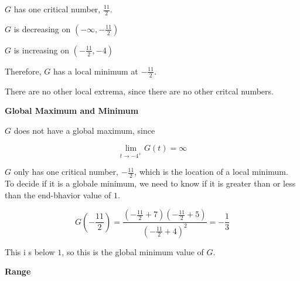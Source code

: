 \documentclass{ximera}
\begin{document}
\begin{explanation}


$G$ has one critical number, $\frac{11}{2}$.


$G$ is decreasing on $\left( -\infty, -\frac{11}{2} \right)$

$G$ is increasing on $\left( -\frac{11}{2}, -4 \right)$

Therefore, $G$ has a local minimum at $-\frac{11}{2}$.


There are no other local extrema, since there are no other critcal numbers.


\end{explanation}












\textbf{Global Maximum and Minimum}

\begin{explanation}


$G$ does not have a global maximum, since 


\[
\lim\limits_{t \to -4^+} G(t) = \infty
\]


$G$ only has one critical number, $-\frac{11}{2}$, which is the location of a local minimum.  To decide if it is a globale minimum, we need to know if it is greater than or less than the end-bhavior value of $1$.




\[
G\left( -\frac{11}{2} \right) = \frac{\left( -\frac{11}{2}+7 \right) \left( -\frac{11}{2}+5 \right)}{\left( -\frac{11}{2}+4 \right)^2} = -\frac{1}{3} 
\]


This i s below $1$, so this is the global minimum value of $G$. \\



\end{explanation}














\textbf{Range}
\end{document}
